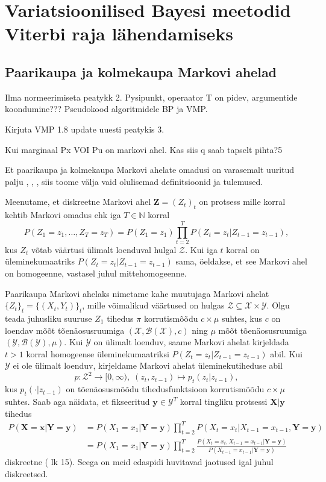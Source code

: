 \section{Variatsioonilised Bayesi meetodid Viterbi raja lähendamiseks}

\subsection{Paarikaupa ja kolmekaupa Markovi ahelad}

Ilma normeerimiseta peatykk 2.
Pysipunkt, operaator T on pidev, argumentide koondumine???
Pseudokood algoritmidele BP ja VMP.

Kirjuta VMP 1.8 update uuesti peatykis 3.

Kui marginaal Px VOI Pu on markovi ahel. Kas siis q saab tapselt pihta?5

Et paarikaupa ja kolmekaupa Markovi ahelate omadusi on varasemalt uuritud palju \parencite{kuljus2022hybridclassifierspairwisemarkov}, \parencite{Soop.2023}, \parencite{Avans.2021}, siis toome välja vaid olulisemad definitsioonid ja tulemused.

Meenutame, et diskreetne Markovi ahel $\bm{Z} = (Z_t)_{t}$ on protsess mille korral kehtib Markovi omadus ehk iga $T \in \mathbb{N}$ korral
$$P(Z_1=z_1,\ldots,Z_T=z_T) = P(Z_1=z_1)\prod_{t=2}^T P(Z_t=z_t | Z_{t-1} = z_{t-1}),$$ 
kus $Z_t$ võtab väärtusi ülimalt loenduval hulgal $\mathcal{Z}$. Kui iga $t$ korral on üleminekumaatriks $P(Z_t=z_t | Z_{t-1} = z_{t-1})$ sama, öeldakse, et see Markovi ahel on  homogeenne, vastasel juhul mittehomogeenne.

Paarikaupa Markovi ahelaks nimetame kahe muutujaga Markovi ahelat $\{Z_t\}_{t} = \{(X_t,Y_t)\}_{t}$, mille võimalikud väärtused on hulgas $\mathcal{Z} \subseteq \mathcal{X} \times \mathcal{Y}$. Olgu teada juhusliku suuruse $Z_1$ tihedus $\pi$ korrutismõõdu $c \times \mu$ suhtes, kus $c$ on loendav mõõt tõenäosusruumiga $(\mathcal{X}, \mathcal{B}(\mathcal{X}),c) $ ning $\mu$ mõõt tõenäosusruumiga $(\mathcal{Y}, \mathcal{B}(\mathcal{Y}),\mu)$. Kui $\mathcal{Y}$ on ülimalt loenduv, saame Markovi ahelat kirjeldada $t>1$ korral homogeense üleminekumaatriksi $P(Z_t = z_t|Z_{t-1} = z_{t-1})$ abil. Kui $\mathcal{Y}$ ei ole ülimalt loenduv, kirjeldame Markovi ahelat üleminekutiheduse abil
$$p: \mathcal{Z}^2 \rightarrow [0,\infty),\; (z_t,z_{t-1}) \mapsto p_t(z_t|z_{t-1}),$$
kus $p_t(\cdot|z_{t-1})$ on tõenäosusmõõdu tihedusfunktsioon korrutismõõdu $c \times \mu$ suhtes. Saab aga näidata, et fikseeritud $\bm{y} \in \mathcal{Y}^T$ korral tingliku protsessi $\bm{X}|\bm{y}$ tihedus
\begin{align*}
    P(\bm{X} = \bm{x}|\bm{Y}=\bm{y}) &= P(X_1 = x_1|\bm{Y}=\bm{y}) \prod_{t=2}^T P(X_t = x_t|X_{t-1} = x_{t-1}, \bm{Y}=\bm{y})\\
    &= P(X_1 = x_1|\bm{Y}=\bm{y}) \prod_{t=2}^T \frac{P(X_t = x_t, X_{t-1} = x_{t-1} |\bm{Y}= \bm{y})}{P(X_{t-1} = x_{t-1} | \bm{Y}=\bm{y})}
\end{align*}
diskreetne (\cite{Avans.2021} lk 15). Seega on meid edaspidi huvitavad jaotused igal juhul diskreetsed.

